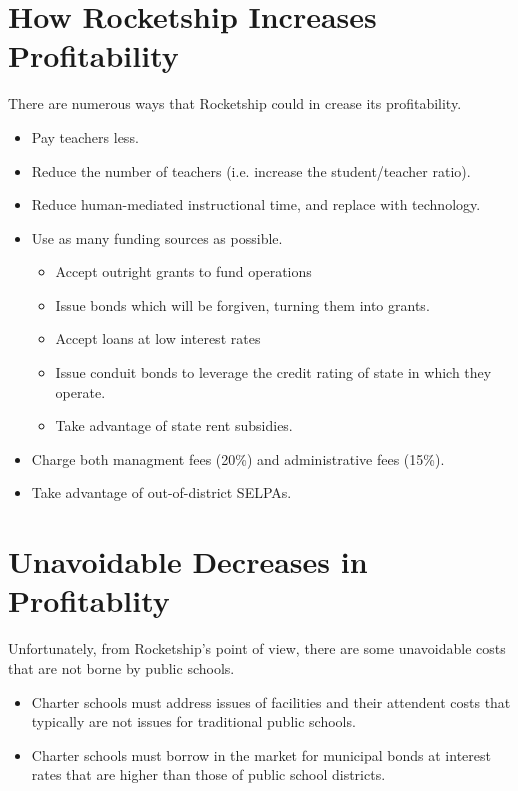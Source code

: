 \section{How Rocketship Increases Profitability}\indent%
\label{sec:how-rock-incr}

There are numerous ways that Rocketship could in crease its profitability.
\begin{itemize}
  \item Pay teachers less.
  \item Reduce the number of teachers (i.e. increase the student/teacher ratio).
  \item Reduce human-mediated instructional time, and replace with technology.
  \item Use as many funding sources as possible.
  \begin{itemize}
    \item Accept outright grants to fund operations
    \item Issue bonds which will be forgiven, turning them into grants.
    \item Accept loans at low interest rates
    \item Issue conduit bonds to leverage the credit rating of state in which they operate.
    \item Take advantage of state rent subsidies.
      \end{itemize}
  \item Charge both managment fees (20\%) and administrative fees (15\%). 
  \item Take advantage of out-of-district SELPAs.
\end{itemize}

\section{Unavoidable Decreases in Profitablity}\indent%
\label{sec:unavoidable_decr_profit}

Unfortunately, from Rocketship's point of view, there are some unavoidable costs that are not borne by public schools.
\begin{itemize}
  \item Charter schools must address issues of facilities and their attendent costs that typically are not issues for traditional public schools.
  \item Charter schools must borrow in the market for municipal bonds at interest rates that are higher than those of public school districts.
\end{itemize}

